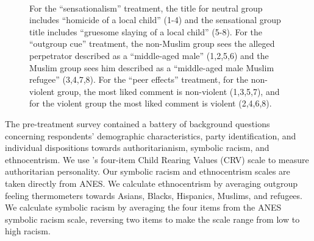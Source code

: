 \begin{figure}[!htbp]
\\ \vspace{.5em}
    \begin{minipage}{\textwidth}
      \footnotesize
      \setlength{\parskip}{0pt}
      \setlength{\parindent}{0pt}
      For the \textcolor{colorSensationalism}{``sensationalism''} treatment, the title for neutral group includes ``homicide of a local child'' (1-4) and the sensational group title includes ``gruesome slaying of a local child'' (5-8). For the \textcolor{colorOutgroupCue}{``outgroup cue''} treatment, the non-Muslim group sees the alleged perpetrator described as a ``middle-aged male'' (1,2,5,6) and the Muslim group sees him described as a ``middle-aged male Muslim refugee'' (3,4,7,8). For the \textcolor{colorPeerEffects}{``peer effects''} treatment, for the non-violent group, the most liked comment is non-violent (1,3,5,7), and for the violent group the most liked comment is violent (2,4,6,8).
    \end{minipage}
\end{figure}


The pre-treatment survey contained a battery of background questions concerning respondents' demographic characteristics, party identification, and individual dispositions towards authoritarianism, symbolic racism, and ethnocentrism. We use \cite{feldman1997perceived}'s four-item Child Rearing Values (CRV) scale to measure authoritarian personality. Our symbolic racism and ethnocentrism scales are taken directly from ANES. We calculate ethnocentrism by averaging outgroup feeling thermometers towards Asians, Blacks, Hispanics, Muslims, and refugees. We calculate symbolic racism by averaging the four items from the ANES symbolic racism scale, reversing two items to make the scale range from low to high racism.

